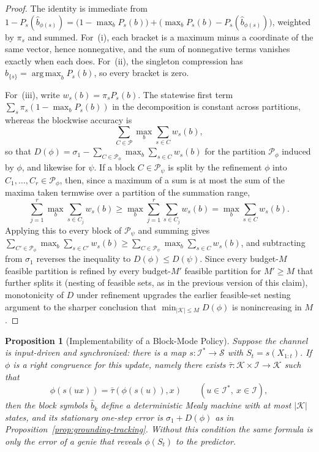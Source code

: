 \documentclass[12pt]{article}
\newtheorem{proposition}[theorem]{Proposition}
\theoremstyle{definition}
\DeclareMathOperator*{\argmax}{arg\,max}
\begin{document}
\begin{proof}
The identity is immediate from
$1-P_s(\hat b_{\phi(s)})=\bigl(1-\max_bP_s(b)\bigr)+\bigl(\max_bP_s(b)-P_s(\hat b_{\phi(s)})\bigr)$,
weighted by $\pi_s$ and summed.  For~(i), each bracket is a maximum minus a
coordinate of the same vector, hence nonnegative, and the sum of nonnegative
terms vanishes exactly when each does.  For~(ii), the singleton compression has
$\hat b_{\{s\}}=\argmax_bP_s(b)$, so every bracket is zero.

For~(iii), write $w_s(b)=\pi_sP_s(b)$.  The statewise first term
$\sum_s\pi_s(1-\max_bP_s(b))$ in the decomposition is constant across
partitions, whereas the blockwise accuracy is
\[
\sum_{C\in\mathcal P}\max_b\sum_{s\in C}w_s(b),
\]
so that $D(\phi)=\sigma_1-\sum_{C\in\mathcal P_\phi}\max_b\sum_{s\in C}w_s(b)$
for the partition $\mathcal P_\phi$ induced by $\phi$, and likewise for
$\psi$.  If a block $C\in\mathcal P_\psi$ is split by the refinement $\phi$
into $C_1,\dots,C_r\in\mathcal P_\phi$, then, since a maximum of a sum is at
most the sum of the maxima taken termwise over a partition of the summation
range,
\[
\sum_{j=1}^r\max_b\sum_{s\in C_j}w_s(b)
\ge
\max_b\sum_{j=1}^r\sum_{s\in C_j}w_s(b)
=
\max_b\sum_{s\in C}w_s(b).
\]
Applying this to every block of $\mathcal P_\psi$ and summing gives
$\sum_{C'\in\mathcal P_\phi}\max_b\sum_{s\in C'}w_s(b)
\ge\sum_{C\in\mathcal P_\psi}\max_b\sum_{s\in C}w_s(b)$, and subtracting from
$\sigma_1$ reverses the inequality to $D(\phi)\le D(\psi)$.  Since every
budget-$M$ feasible partition is refined by every budget-$M'$ feasible
partition for $M'\ge M$ that further splits it (nesting of feasible sets, as
in the previous version of this claim), monotonicity of $D$ under
refinement upgrades the earlier feasible-set nesting argument to the sharper
conclusion that $\min_{|\mathcal K|\le M}D(\phi)$ is nonincreasing in $M$.
\end{proof}

\begin{proposition}[Implementability of a Block-Mode Policy]
\label{prop:block-mode-implementability}
Suppose the channel is input-driven and synchronized: there is a map
$s:\mathcal I^*\to\mathcal S$ with $S_t=s(X_{1:t})$.  If $\phi$ is a right
congruence for this update, namely there exists
$\bar\tau:\mathcal K\times\mathcal I\to\mathcal K$ such that
\[
\phi(s(ux))=\bar\tau(\phi(s(u)),x)
\qquad(u\in\mathcal I^*,\ x\in\mathcal I),
\]
then the block symbols $\hat b_k$ define a deterministic Mealy machine with
at most $|\mathcal K|$ states, and its stationary one-step error is
$\sigma_1+D(\phi)$ as in Proposition~\ref{prop:grounding-tracking}.  Without
this condition the same formula is only the error of a genie that reveals
$\phi(S_t)$ to the predictor.
\end{proposition}
\end{document}

